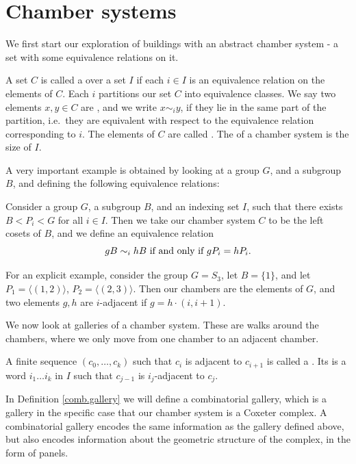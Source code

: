 \documentclass[11pt]{article}
\begin{document}
\section{Chamber systems} \label{2}
We first start our exploration of buildings with an abstract chamber system - a set with some equivalence relations on it.  

\begin{definition}
    A set $C$ is called a  over a set $I$ if each $i\in I$ is an equivalence relation on the elements of $C$. Each $i$ partitions our set $C$ into equivalence classes. We say two elements $x,y\in C$ are , and we write $x\sim_{i} y$, if they lie in the same part of the partition, i.e.\ they are equivalent with respect to the equivalence relation corresponding to $i$. The elements of $C$ are called . The  of a chamber system is the size of $I$. 
\end{definition}


A very important example is obtained by looking at a group $G$, and a subgroup $B$, and defining the following equivalence relations: 

\begin{example}\label{S3}
    Consider a group $G$, a subgroup $B$, and an indexing set $I$, such that there exists $B<P_i<G$ for all $i\in I$. Then we take our chamber system $C$ to be the left cosets of $B$, and we define an equivalence relation
    \[gB\sim_{i}hB \textnormal{ if and only if }gP_i=hP_i.\]

    For an explicit example, consider the group $G=S_3$, let $B=\{1\}$, and let $P_1=\langle (1,2)\rangle$, $P_2=\langle (2,3)\rangle$. Then our chambers are the elements of $G$, and two elements $g,h$ are $i$-adjacent if $g=h\cdot(i,i+1)$. 
\end{example}

We now look at galleries of a chamber system. These are walks around the chambers, where we only move from one chamber to an adjacent chamber. 

\begin{definition}\label{gallery}
    A finite sequence $(c_0,\hdots ,c_k)$ such that $c_i$ is adjacent to $c_{i+1}$ is called a . Its  is a word $i_1\hdots i_k$ in $I$ such that  $c_{j-1}$ is $i_j$-adjacent to $c_{j}$. 
\end{definition}

In Definition \ref{comb.gallery} we will define a combinatorial gallery, which is a gallery in the specific case that our chamber system is a Coxeter complex. A combinatorial gallery encodes the same information as the gallery defined above, but also encodes information about the geometric structure of the complex, in the form of panels. 
\end{document}
